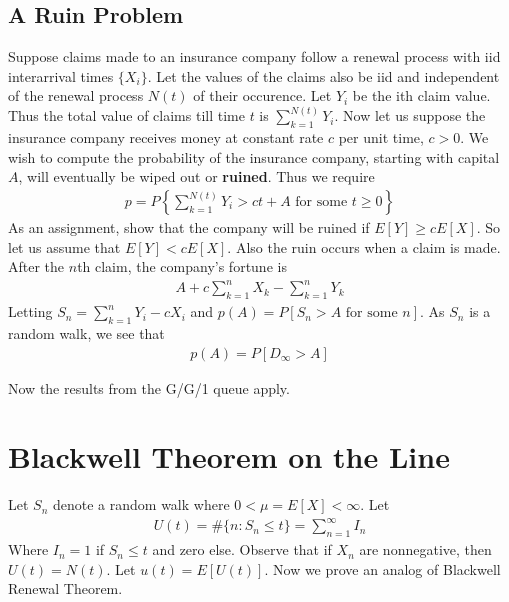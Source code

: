 \documentclass[a4paper,10pt,english]{article}
\begin{document}
\subsection{A Ruin Problem}
Suppose claims made to an insurance company follow a renewal process with iid interarrival times $\{X_i\}$. Let the values of the claims also be iid and independent of the renewal process $N(t)$ of their occurence. Let $Y_i$ be the ith claim value. Thus the total value of claims till time $t$ is $\sum_{k=1}^{N(t)}Y_i$. Now let us suppose the insurance company receives money at constant rate $c$ per unit time, $c>0$. We wish to compute the probability of the insurance company, starting with capital $A$, will eventually be wiped out or \textbf{ruined}. Thus we require
\begin{align*}p = P\left\{ \sum_{k=1}^{N(t)}Y_i > ct + A \mbox{ for some } t\geq 0\right\}\end{align*}
As an assignment, show that the company will be ruined if $E[Y] \geq cE[X]$. So let us assume that $E[Y] < cE[X]$. Also the ruin occurs when a claim is made. After the $n$th claim, the company's fortune is
\begin{align*}A + c\sum_{k=1}^n X_k -\sum_{k=1}^n Y_k \end{align*}
Letting $S_n = \sum_{k=1}^n Y_i - cX_i$ and $p(A) = P[S_n > A \mbox{ for some }n]$. As $S_n$ is a random walk, we see that 
\begin{align*}p(A) = P[D_\infty > A]\end{align*}

Now the results from the G/G/1 queue apply.

\section{Blackwell Theorem on the Line}
Let $S_n$ denote a random walk where $0<\mu=E[X] < \infty$. Let 
\begin{align*}U(t)=\#\{n: S_n \leq t\} = \sum_{n=1}^\infty I_n\end{align*}
Where $I_n=1$ if $S_n \leq t$ and zero else. Observe that if $X_n$ are nonnegative, then $U(t) = N(t)$. Let $u(t) = E[U(t)]$. Now we prove an analog of Blackwell Renewal Theorem. 
\end{document}
